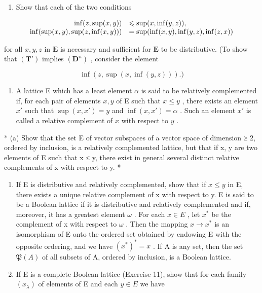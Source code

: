 \begin{enumerate}
\def\labelenumi{(\alph{enumi})}
\setcounter{enumi}{2}
\tightlist
\item
  Show that each of the two conditions
\end{enumerate}

\[
\begin{array}{r l} \inf (z, \sup (x, y)) & \leqslant \sup (x, \inf (y, z)), \\ \inf (\sup (x, y), \sup (z, \inf (x, y))) & = \sup (\inf (x, y), \inf (y, z), \inf (z, x)) \end{array}
\]

for all \(x, y, z\) in \(\mathbf{E}\) is necessary and sufficient for \(\mathbf{E}\) to be distributive. (To show that \((\mathbf{T}')\) implies \((\mathbf{D}^n)\) , consider the element

\[
\inf (z, \sup (x, \inf (y, z))).)
\]

\begin{enumerate}
\def\labelenumi{\arabic{enumi}.}
\setcounter{enumi}{16}
\tightlist
\item
  A lattice E which has a least element \(\alpha\) is said to be relatively complemented if, for each pair of elements \(x, y\) of E such that \(x \leqslant y\) , there exists an element \(x'\) such that \(\sup (x, x') = y\) and \(\inf (x, x') = \alpha\) . Such an element \(x'\) is called a relative complement of \(x\) with respect to \(y\) .
\end{enumerate}

* (a) Show that the set E of vector subspaces of a vector space of dimension ≥ 2, ordered by inclusion, is a relatively complemented lattice, but that if x, y are two elements of E such that x ≤ y, there exist in general several distinct relative complements of x with respect to y. *

\begin{enumerate}
\def\labelenumi{(\alph{enumi})}
\setcounter{enumi}{1}
\item
  If E is distributive and relatively complemented, show that if \(x \leqslant y\) in E, there exists a unique relative complement of x with respect to y. E is said to be a Boolean lattice if it is distributive and relatively complemented and if, moreover, it has a greatest element \(\omega\) . For each \(x \in E\) , let \(x^{*}\) be the complement of x with respect to \(\omega\) . Then the mapping \(x \to x^{*}\) is an isomorphism of E onto the ordered set obtained by endowing E with the opposite ordering, and we have \((x^{*})^{*} = x\) . If A is any set, then the set \(\mathfrak{P}(A)\) of all subsets of A, ordered by inclusion, is a Boolean lattice.
\item
  If E is a complete Boolean lattice (Exercise 11), show that for each family \((x_{\lambda})\) of elements of E and each \(y \in E\) we have
\end{enumerate}

